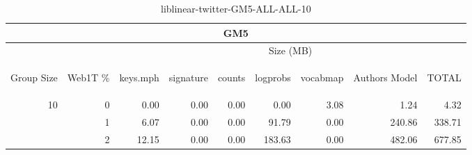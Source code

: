 \begin{center}
\begin{table}[htbp] 
 \begin{center}
\begin{tabular}{ | r | r | r | r | r | r | r | r | r |}
\hline
\multicolumn{9}{|c|}{GM5}\\
\hline
 & & \multicolumn{7}{|c|}{Size (MB)}\\ \cline{3-9}
\begin{sideways}Group Size\end{sideways} & \begin{sideways}Web1T \% \end{sideways} & \begin{sideways}keys.mph\end{sideways} & \begin{sideways}signature\end{sideways} & \begin{sideways}counts\end{sideways} & \begin{sideways}logprobs\end{sideways} & \begin{sideways}vocabmap\end{sideways} & \begin{sideways}Authors Model \end{sideways} & \begin{sideways}TOTAL\end{sideways}\\
\hline
\multirow{2}{*}{10}
 & 0 & 0.00 & 0.00 & 0.00 & 0.00 & 3.08 & 1.24 & 4.32\\ \cline{2-9}
 & 1 & 6.07 & 0.00 & 0.00 & 91.79 & 0.00 & 240.86 & 338.71\\ \cline{2-9}
 & 2 & 12.15 & 0.00 & 0.00 & 183.63 & 0.00 & 482.06 & 677.85\\ \cline{2-9}
\hline
\end{tabular}
\caption{liblinear-twitter-GM5-ALL-ALL-10}
\label{table:liblinear-twitter-GM5-ALL-ALL-10}
\end{center}
 \end{table}
\end{center}

